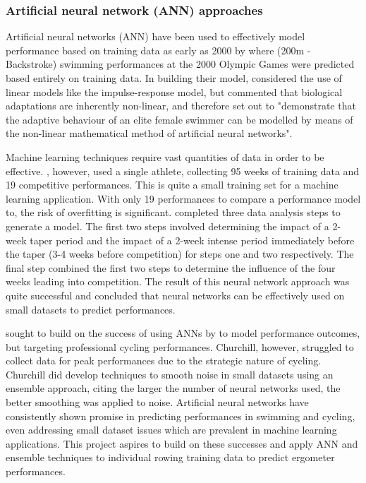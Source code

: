 \subsubsection{Artificial neural network (ANN) approaches}
Artificial neural networks (ANN) have been used to effectively model performance based on training data as early as 2000 by \textcite{Edelmannnusser2002} where (200m - Backstroke) swimming performances at the 2000 Olympic Games were predicted based entirely on training data. In building their model, \textcite{Edelmannnusser2002} considered the use of linear models like the impulse-response model, but commented that biological adaptations are inherently non-linear, and therefore set out to "demonstrate that the adaptive behaviour of an elite female swimmer can be modelled by means of the non-linear mathematical method of artificial neural networks". 

Machine learning techniques require vast quantities of data in order to be effective. \textcite{Edelmannnusser2002}, however, used a single athlete, collecting 95 weeks of training data and 19 competitive performances. This is quite a small training set for a machine learning application. With only 19 performances to compare a performance model to, the risk of overfitting is significant. \textcite{Edelmannnusser2002} completed three data analysis steps to generate a model. The first two steps involved determining the impact of a 2-week taper period and the impact of a 2-week intense period immediately before the taper (3-4 weeks before competition) for steps one and two respectively. The final step combined the first two steps to determine the influence of the four weeks leading into competition. The result of this neural network approach was quite successful and \textcite{Edelmannnusser2002} concluded that neural networks can be effectively used on small datasets to predict performances. 

\textcite{Churchill2014} sought to build on the success of using ANNs by \textcite{Edelmannnusser2002} to model performance outcomes, but targeting professional cycling performances. Churchill, however, struggled to collect data for peak performances due to the strategic nature of cycling. Churchill did develop techniques to smooth noise in small datasets using an ensemble approach, citing the larger the number of neural networks used, the better smoothing was applied to noise. Artificial neural networks have consistently shown promise in predicting performances in swimming and cycling, even addressing small dataset issues which are prevalent in machine learning applications. This project aspires to build on these successes and apply ANN and ensemble techniques to individual rowing training data to predict ergometer performances.
